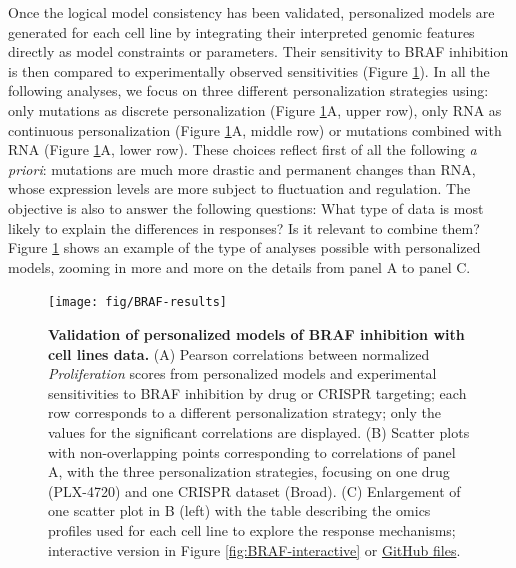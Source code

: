 \documentclass[a4paper,12pt,twoside,onecolumn,openright,final,oldfontcommands]{memoir}
\begin{document}
Once the logical model consistency has been validated, personalized
models are generated for each cell line by integrating their interpreted
genomic features directly as model constraints or parameters. Their
sensitivity to BRAF inhibition is then compared to experimentally
observed sensitivities (Figure \ref{fig:BRAF-results}). In all the
following analyses, we focus on three different personalization
strategies using: only mutations as discrete personalization (Figure
\ref{fig:BRAF-results}A, upper row), only RNA as continuous
personalization (Figure \ref{fig:BRAF-results}A, middle row) or
mutations combined with RNA (Figure \ref{fig:BRAF-results}A, lower row).
These choices reflect first of all the following \emph{a priori}:
mutations are much more drastic and permanent changes than RNA, whose
expression levels are more subject to fluctuation and regulation. The
objective is also to answer the following questions: What type of data
is most likely to explain the differences in responses? Is it relevant
to combine them? Figure \ref{fig:BRAF-results} shows an example of the
type of analyses possible with personalized models, zooming in more and
more on the details from panel A to panel C.

\begin{figure}

{\centering \texttt{[image: fig/BRAF-results]} 

}

\caption[Validation of personalized models of BRAF inhibition with cell lines data]{\textbf{Validation of personalized models of
BRAF inhibition with cell lines data.} (A) Pearson correlations between
normalized \emph{Proliferation} scores from personalized models and
experimental sensitivities to BRAF inhibition by drug or CRISPR
targeting; each row corresponds to a different personalization strategy;
only the values for the significant correlations are displayed. (B)
Scatter plots with non-overlapping points corresponding to correlations
of panel A, with the three personalization strategies, focusing on one
drug (PLX-4720) and one CRISPR dataset (Broad). (C) Enlargement of one
scatter plot in B (left) with the table describing the omics profiles
used for each cell line to explore the response mechanisms; interactive
version in Figure \ref{fig:BRAF-interactive} or
\href{https://github.com/sysbio-curie/PROFILE_BRAF_Model/blob/master/Analysis.html}{GitHub
files}.}\label{fig:BRAF-results}
\end{figure}
\end{document}
